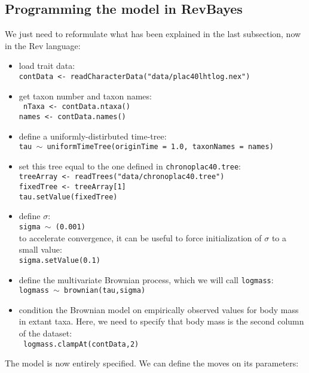 \documentclass[usletter]{article}
\newcommand{\cmd}[1]{\texttt{#1}}
\begin{document}
\subsection*{Programming the model in RevBayes}

We just need to reformulate what has been explained in the last subsection, now in the Rev language:
\begin{itemize}
\item
load trait data:
\\
\cmd{contData <- readCharacterData("data/plac40lhtlog.nex")}
\item
get taxon number and taxon names:
\\
\cmd{
nTaxa <- contData.ntaxa()
\\
names <- contData.names()
}
\item
define a uniformly-distirbuted time-tree:
\\
\cmd{tau $\sim$ uniformTimeTree(originTime = 1.0, taxonNames = names)}
\item
set this tree equal to the one defined in \cmd{chronoplac40.tree}:
\\
\cmd{treeArray <- readTrees("data/chronoplac40.tree")
\\
fixedTree <- treeArray[1]
\\
tau.setValue(fixedTree)}
\item
define $\sigma$:
\\
\cmd{sigma $\sim$ (0.001)}
\\
to accelerate convergence, it can be useful to force initialization of $\sigma$ to a small value:
\\
\cmd{sigma.setValue(0.1)}
\item
define the multivariate Brownian process, which we will call \cmd{logmass}:
\\
\cmd{logmass $\sim$ brownian(tau,sigma)}
\item
condition the Brownian model on empirically observed values for body mass in extant taxa.
Here, we need to specify that body mass is the second column of the dataset:
\\
\cmd{
logmass.clampAt(contData,2)
}
\end{itemize}
The model is now entirely specified. We can define the moves on its parameters:
\end{document}
